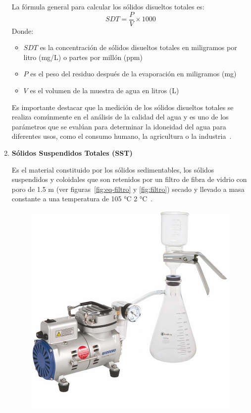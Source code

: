 \begin{enumerate}[label=\textbf{$\bullet$}]
	La fórmula general para calcular los sólidos disueltos totales es:
	\begin{equation*}
		SDT = \frac{P}{V} \times 1000
	\end{equation*}
	Donde:
	\begin{itemize}
		\item $SDT$ es la concentración de sólidos disueltos totales en miligramos por litro (mg/L) o partes por millón (ppm)
		\item $P$ es el peso del residuo después de la evaporación en miligramos (mg)
		\item $V$ es el volumen de la muestra de agua en litros (L)
	\end{itemize}
	Es importante destacar que la medición de los sólidos disueltos totales se realiza comúnmente en el análisis de la calidad del agua y es uno de los parámetros que se evalúan para determinar la idoneidad del agua para diferentes usos, como el consumo humano, la agricultura o la industria~\citep{martinez1999,lazcano2016}.\par
	\item \textbf{Sólidos Suspendidos Totales (SST)} \par
	Es el material constituido por los sólidos sedimentables, los sólidos  suspendidos y coloidales que son retenidos por un filtro de fibra de vidrio con poro de 1.5 m (ver figuras~\ref{fig:eq-filtro} y \ref{fig:filtro}) secado y llevado a masa constante a una temperatura de 105 °C  2 °C~\citep{Economia2015}.
	\begin{figure}[H]
		\centering
		\includegraphics[scale=0.45]{../Images/filtro-solidos.jpg}

\end{figure}
\end{enumerate}
